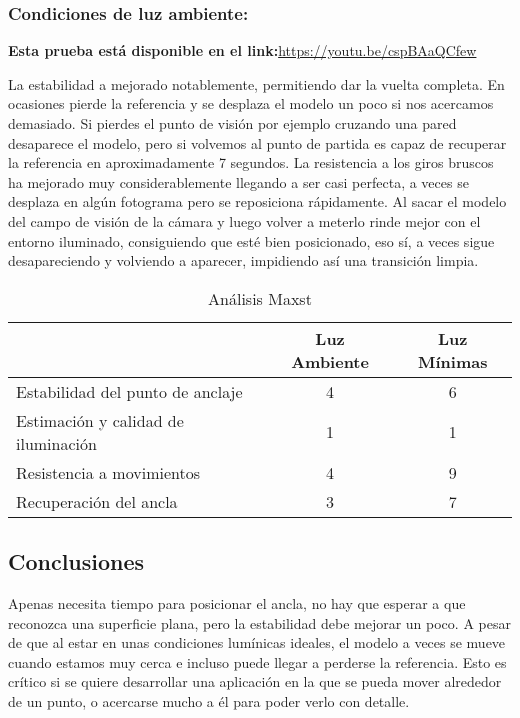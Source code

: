 \subsubsection{Condiciones de luz ambiente:}

\textbf{Esta prueba está disponible en el link:}\url{https://youtu.be/cspBAaQCfew}

La estabilidad a mejorado notablemente, permitiendo dar la vuelta completa. En ocasiones pierde la referencia y se desplaza el modelo un poco si nos acercamos demasiado. Si pierdes el punto de visión por ejemplo cruzando una pared desaparece el modelo, pero si volvemos al punto de partida es capaz de recuperar la referencia en aproximadamente 7 segundos. La resistencia a los giros bruscos ha mejorado muy considerablemente llegando a ser casi perfecta, a veces se desplaza en algún fotograma pero se reposiciona rápidamente. Al sacar el modelo del campo de visión de la cámara y luego volver a meterlo rinde mejor con el entorno iluminado, consiguiendo que esté bien posicionado, eso sí, a veces sigue desapareciendo y volviendo a aparecer, impidiendo así una transición limpia.

\begin{table}[H]
    \centering
      \begin{tabular}{|l|c|c|}
    \hline
          & Luz Ambiente & Luz Mínimas \\
         \hline
        Estabilidad del punto de anclaje   &4 &6\\
        \hline
        Estimación y calidad de iluminación  &1 &1 \\
        \hline
        Resistencia a movimientos  &4 &9 \\
        \hline
        Recuperación del ancla  &3 &7 \\
      \hline
    \end{tabular}
    \caption{Análisis Maxst}
    \label{tab:TMaxst}
\end{table}
\subsection{Conclusiones}
Apenas necesita tiempo para posicionar el ancla, no hay que esperar a que reconozca una superficie plana, pero la estabilidad debe mejorar un poco. A pesar de que al estar en unas condiciones lumínicas ideales, el modelo a veces se mueve cuando estamos muy cerca e incluso puede llegar a perderse la referencia. Esto es crítico si se quiere desarrollar una aplicación en la que se pueda mover alrededor de un punto, o acercarse mucho a él para poder verlo con detalle. 
\clearpage
